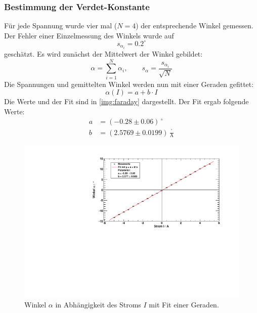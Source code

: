 \subsubsection{Bestimmung der Verdet-Konstante}
Für jede Spannung wurde vier mal ($N=4$) der entsprechende Winkel gemessen. Der Fehler einer Einzelmessung des Winkels wurde auf
\begin{equation}
  s_{\alpha_i} = 0.2^\circ
\end{equation}  %
geschätzt. Es wird zunächst der Mittelwert der Winkel gebildet:
\begin{equation}
  \alpha = \sum_{i=1}^{N} \alpha_i, \qquad s_{\alpha} = \frac{s_{\alpha_i}}{\sqrt{N}}
\end{equation}
Die Spannungen und gemittelten Winkel werden nun mit einer Geraden gefittet:
\begin{equation}
  \alpha(I) = a + b \cdot I
\end{equation}
Die Werte und der Fit sind in \autoref{img:faraday} dargestellt. Der Fit ergab folgende Werte:
\begin{equation}
\begin{split}
  \label{eq:faraday:params}
  a &= (-0.28 \pm 0.06)\,{}^\circ \\
  b &= (2.5769 \pm 0.0199)\,\frac{{}^\circ}{\text{A}}
\end{split}
\end{equation}
\begin{figure}[H]
\begin{center}
  \includegraphics[width=\textwidth]{../img/faraday.pdf}
  \caption{Winkel $\alpha$ in Abhängigkeit des Stroms $I$ mit Fit einer Geraden.}
  \label{img:faraday}
\end{center}
\end{figure}
